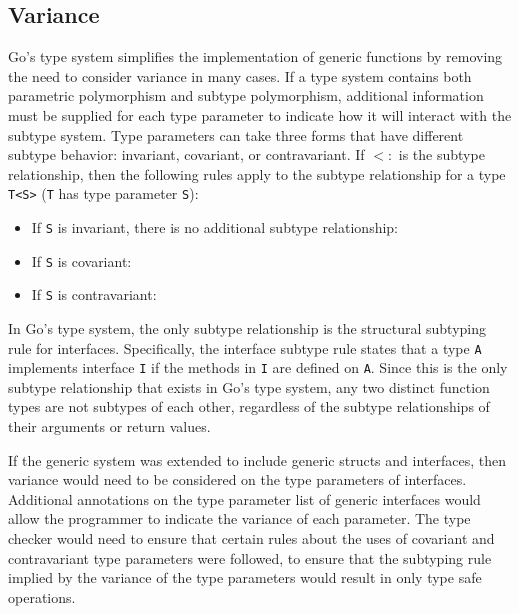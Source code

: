 \documentclass[letterpaper,twocolumn,11pt]{article}
\begin{document}
\subsection{Variance} \label{variance}

Go's type system simplifies the implementation of generic functions by removing the need to consider variance in many cases. If a type system contains both parametric polymorphism and subtype polymorphism, additional information must be supplied for each type parameter to indicate how it will interact with the subtype system. Type parameters can take three forms that have different subtype behavior: invariant, covariant, or contravariant. If $<:$ is the subtype relationship, then the following rules apply to the subtype relationship for a type \texttt{T<S>} (\texttt{T} has type parameter \texttt{S}):


\begin{itemize}
\item If \texttt{S} is invariant, there is no additional subtype relationship:
\begin{mathpar}
\end{mathpar}
\item If \texttt{S} is covariant:
\begin{mathpar}
\end{mathpar}

\item If \texttt{S} is contravariant:
\begin{mathpar}
\end{mathpar}
\end{itemize}

In Go's type system, the only subtype relationship is the structural subtyping rule for interfaces. Specifically, the interface subtype rule states that a type \texttt{A} implements interface \texttt{I} if the methods in \texttt{I} are defined on \texttt{A}. Since this is the only subtype relationship that exists in Go's type system, any two distinct function types are not subtypes of each other, regardless of the subtype relationships of their arguments or return values. 

If the generic system was extended to include generic structs and interfaces, then variance would need to be considered on the type parameters of interfaces. Additional annotations on the type parameter list of generic interfaces would allow the programmer to indicate the variance of each parameter. The type checker would need to ensure that certain rules about the uses of covariant and contravariant type parameters were followed, to ensure that the subtyping rule implied by the variance of the type parameters would result in only type safe operations.
\end{document}
